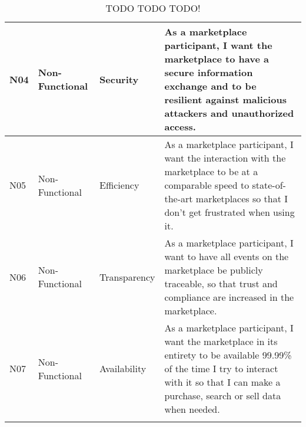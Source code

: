 \begin{xltabular}{\textwidth}{lllX}
    N04 & Non-Functional & Security & As a marketplace participant, I want the marketplace to have a secure information exchange and to be resilient against malicious attackers and unauthorized access.   \\ \midrule
    N05 & Non-Functional & Efficiency & As a marketplace participant, I want the interaction with the marketplace to be at a comparable speed to state-of-the-art marketplaces so that I don't get frustrated when using it. \\ \midrule
    N06 & Non-Functional & Transparency & As a marketplace participant, I want to have all events on the marketplace be publicly traceable, so that trust and compliance are increased in the marketplace.  \\ \midrule
    N07 & Non-Functional & Availability & As a marketplace participant, I want the marketplace in its entirety to be available 99.99\% of the time I try to interact with it so that I can make a purchase, search or sell data when needed. 
    \\ \bottomrule
\caption{TODO TODO TODO!} \label{tab:nfr-vs-fr}
\end{xltabular}%
